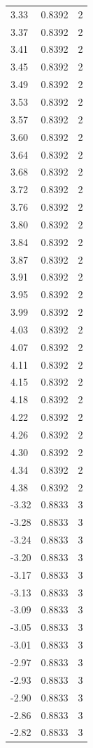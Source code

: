 \begin{longtable}{lrr}
  3.33 & 0.8392 & 2 \\
  3.37 & 0.8392 & 2 \\
  3.41 & 0.8392 & 2 \\
  3.45 & 0.8392 & 2 \\
  3.49 & 0.8392 & 2 \\
  3.53 & 0.8392 & 2 \\
  3.57 & 0.8392 & 2 \\
  3.60 & 0.8392 & 2 \\
  3.64 & 0.8392 & 2 \\
  3.68 & 0.8392 & 2 \\
  3.72 & 0.8392 & 2 \\
  3.76 & 0.8392 & 2 \\
  3.80 & 0.8392 & 2 \\
  3.84 & 0.8392 & 2 \\
  3.87 & 0.8392 & 2 \\
  3.91 & 0.8392 & 2 \\
  3.95 & 0.8392 & 2 \\
  3.99 & 0.8392 & 2 \\
  4.03 & 0.8392 & 2 \\
  4.07 & 0.8392 & 2 \\
  4.11 & 0.8392 & 2 \\
  4.15 & 0.8392 & 2 \\
  4.18 & 0.8392 & 2 \\
  4.22 & 0.8392 & 2 \\
  4.26 & 0.8392 & 2 \\
  4.30 & 0.8392 & 2 \\
  4.34 & 0.8392 & 2 \\
  4.38 & 0.8392 & 2 \\
  -3.32 & 0.8833 & 3 \\
  -3.28 & 0.8833 & 3 \\
  -3.24 & 0.8833 & 3 \\
  -3.20 & 0.8833 & 3 \\
  -3.17 & 0.8833 & 3 \\
  -3.13 & 0.8833 & 3 \\
  -3.09 & 0.8833 & 3 \\
  -3.05 & 0.8833 & 3 \\
  -3.01 & 0.8833 & 3 \\
  -2.97 & 0.8833 & 3 \\
  -2.93 & 0.8833 & 3 \\
  -2.90 & 0.8833 & 3 \\
  -2.86 & 0.8833 & 3 \\
  -2.82 & 0.8833 & 3 \\

\end{longtable}
